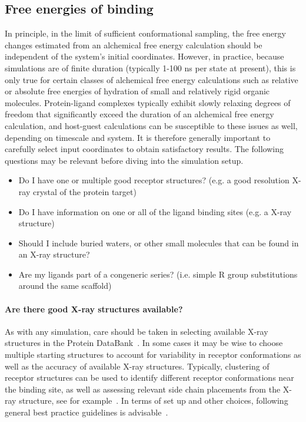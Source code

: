 \documentclass[9pt,bestpractices]{livecoms}
\begin{document}
\subsection{Free energies of binding}
\label{subsec:binding}
In principle, in the limit of sufficient conformational sampling, the free energy changes estimated from an alchemical free energy calculation should be independent of the system's initial coordinates. However, in practice, because simulations are of finite duration (typically 1-100 ns per state at present), this is only true for certain classes of alchemical free energy calculations such as relative or absolute free energies of hydration of small and relatively rigid organic molecules. Protein-ligand complexes typically exhibit slowly relaxing degrees of freedom that significantly exceed the duration of an alchemical free energy calculation, and host-guest calculations can be susceptible to these issues as well, depending on timescale and system. It is therefore generally important to carefully select input coordinates to obtain satisfactory results. 
The following questions may be relevant before diving into the simulation setup.

\begin{itemize}
    \item Do I have one or multiple good receptor structures? (e.g. a good resolution X-ray crystal of the protein target)
    \item Do I have information on one or all of the ligand binding sites (e.g. a X-ray structure)
    \item Should I include buried waters, or other small molecules that can be found in an X-ray structure?
    \item Are my ligands part of a congeneric series? (i.e. simple R group substitutions around the same scaffold)
    \end{itemize}

\paragraph{Are there good X-ray structures available?}
As with any simulation, care should be taken in selecting available X-ray structures in the Protein DataBank~\cite{berman2003announcing}. In some cases it may be wise to choose multiple starting structures to account for variability in receptor conformations as well as the accuracy of available X-ray structures. Typically, clustering of receptor structures can be used to identify different receptor conformations near the binding site, as well as assessing relevant side chain placements from the X-ray structure, see for example~\cite{mey2016blinded}. In terms of set up and other choices, following general best practice guidelines is advisable~\cite{braun2019best}.
\end{document}
